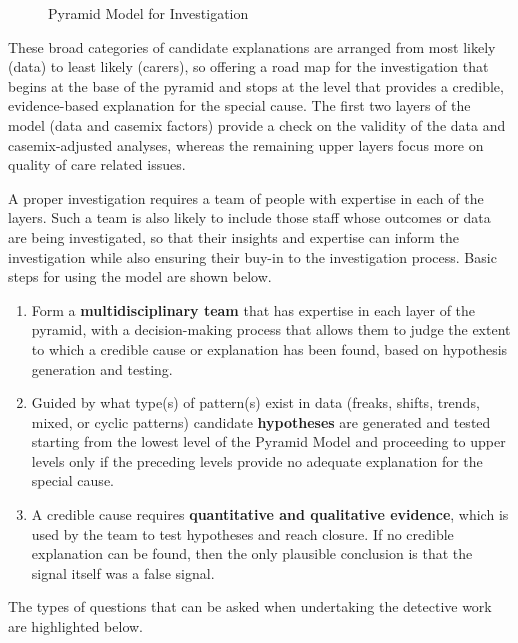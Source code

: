 \documentclass[
]{book}
\makeatletter
\newcommand*\pandocbounded[1]{%
  \sbox\pandoc@box{#1}%
  \Gscale@div\@tempa{\textheight}{\dimexpr\ht\pandoc@box+\dp\pandoc@box\relax}%
  \Gscale@div\@tempb{\linewidth}{\wd\pandoc@box}%
  \ifdim\@tempb\p@<\@tempa\p@\let\@tempa\@tempb\fi%
  \ifdim\@tempa\p@<\p@\scalebox{\@tempa}{\usebox\pandoc@box}%
  \else\usebox{\pandoc@box}%
  \fi%
}
\makeatother
\begin{document}
\begin{figure}
\centering
\pandocbounded{}
\caption{\label{fig:responding-fig1}Pyramid Model for Investigation}
\end{figure}

These broad categories of candidate explanations are arranged from most likely (data) to least likely (carers), so offering a road map for the investigation that begins at the base of the pyramid and stops at the level that provides a credible, evidence-based explanation for the special cause. The first two layers of the model (data and casemix factors) provide a check on the validity of the data and casemix-adjusted analyses, whereas the remaining upper layers focus more on quality of care related issues.

A proper investigation requires a team of people with expertise in each of the layers. Such a team is also likely to include those staff whose outcomes or data are being investigated, so that their insights and expertise can inform the investigation while also ensuring their buy-in to the investigation process. Basic steps for using the model are shown below.

\begin{enumerate}
\def\labelenumi{\arabic{enumi}.}
\item
  Form a \textbf{multidisciplinary team} that has expertise in each layer of the pyramid, with a decision-making process that allows them to judge the extent to which a credible cause or explanation has been found, based on hypothesis generation and testing.
\item
  Guided by what type(s) of pattern(s) exist in data (freaks, shifts, trends, mixed, or cyclic patterns) candidate \textbf{hypotheses} are generated and tested starting from the lowest level of the Pyramid Model and proceeding to upper levels only if the preceding levels provide no adequate explanation for the special cause.
\item
  A credible cause requires \textbf{quantitative and qualitative evidence}, which is used by the team to test hypotheses and reach closure. If no credible explanation can be found, then the only plausible conclusion is that the signal itself was a false signal.
\end{enumerate}

The types of questions that can be asked when undertaking the detective work are highlighted below.
\end{document}
